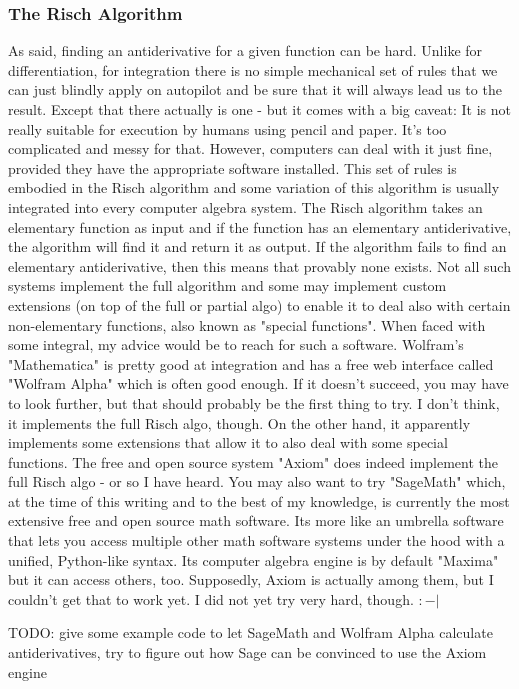 \subsubsection{The Risch Algorithm}
As said, finding an antiderivative for a given function can be hard. Unlike for differentiation, for integration there is no simple mechanical set of rules that we can just blindly apply on autopilot and be sure that it will always lead us to the result. Except that there actually is one - but it comes with a big caveat: It is not really suitable for execution by humans using pencil and paper. It's too complicated and messy for that. However, computers can deal with it just fine, provided they have the appropriate software installed. This set of rules is embodied in the Risch algorithm and some variation of this algorithm is usually integrated into every computer algebra system. The Risch algorithm takes an elementary function as input and if the function has an elementary antiderivative, the algorithm will find it and return it as output. If the algorithm fails to find an elementary antiderivative, then this means that provably none exists. Not all such systems implement the full algorithm and some may implement custom extensions (on top of the full or partial algo) to enable it to deal also with certain non-elementary functions, also known as "special functions". When faced with some integral, my advice would be to reach for such a software. Wolfram's "Mathematica" is pretty good at integration and has a free web interface called "Wolfram Alpha" which is often good enough. If it doesn't succeed, you may have to look further, but that should probably be the first thing to try. I don't think, it implements the full Risch algo, though. On the other hand, it apparently implements some extensions that allow it to also deal with some special functions. The free and open source system "Axiom" does indeed implement the full Risch algo - or so I have heard. You may also want to try "SageMath" which, at the time of this writing and to the best of my knowledge, is currently the most extensive free and open source math software. Its more like an umbrella software that lets you access multiple other math software systems under the hood with a unified, Python-like syntax. Its computer algebra engine is by default "Maxima" but it can access others, too. Supposedly, Axiom is actually among them, but I couldn't get that to work yet. I did not yet try very hard, though. $:-|$

TODO: give some example code to let SageMath and Wolfram Alpha calculate antiderivatives, try to figure out how Sage can be convinced to use the Axiom engine

